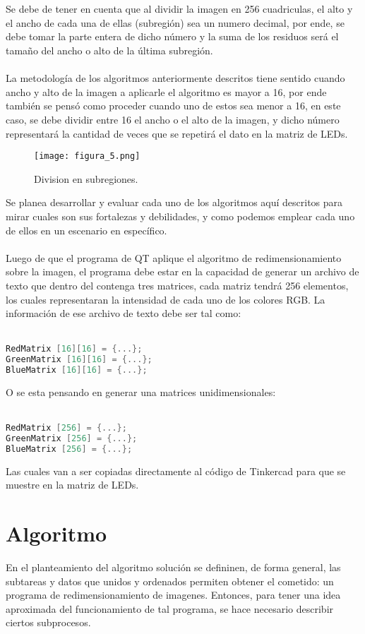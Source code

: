 \documentclass{article}
\begin{document}
\\
\\
Se debe de tener en cuenta que al dividir la imagen en 256 cuadriculas, el alto y el ancho de cada una de ellas (subregión) sea un numero decimal, por ende, se debe tomar la parte entera de dicho número y la suma de los residuos será el tamaño del ancho o alto de la última subregión.
\\
\\
La metodología de los algoritmos anteriormente descritos tiene sentido cuando ancho y alto de la imagen a aplicarle el algoritmo es mayor a 16, por ende también se pensó como proceder cuando uno de estos sea menor a 16, en este caso, se debe dividir entre 16 el ancho o el alto de la imagen, y dicho número representará la cantidad de veces que se repetirá el dato en la matriz de LEDs.
\begin{figure}[h]
  \texttt{[image: figura\_5.png]}
  \centering
  \caption{Division en subregiones.}
  \label{fig:subregiones}
\end{figure}
Se planea desarrollar y evaluar cada uno de los algoritmos aquí descritos para mirar cuales son sus fortalezas y debilidades, y como podemos emplear cada uno de ellos en un escenario en específico.
\\
\\
Luego de que el programa de QT aplique el algoritmo de redimensionamiento sobre la imagen, el programa debe estar en la capacidad de generar un archivo de texto que dentro del contenga tres matrices, cada matriz tendrá 256 elementos, los cuales representaran la intensidad de cada uno de los colores RGB. La información de ese archivo de texto debe ser tal como:
\\
\\
\begin{lstlisting}[language=C++, label=codigo_ejemplo]
RedMatrix [16][16] = {...};
GreenMatrix [16][16] = {...};
BlueMatrix [16][16] = {...};
\end{lstlisting}
O se esta pensando en generar una matrices unidimensionales:
\\
\\
\begin{lstlisting}[language=C++, label=codigo_ejemplo2]
RedMatrix [256] = {...};
GreenMatrix [256] = {...};
BlueMatrix [256] = {...};
\end{lstlisting}
Las cuales van a ser copiadas directamente al código de Tinkercad para que se muestre en la matriz de LEDs.

\section{Algoritmo} \label{algoritmo}
En el planteamiento del algoritmo solución se defininen, de forma general, las subtareas y datos que unidos y ordenados permiten obtener el cometido: un programa de redimensionamiento de imagenes. Entonces, para tener una idea aproximada del funcionamiento de tal programa, se hace necesario describir ciertos subprocesos. 
\end{document}
